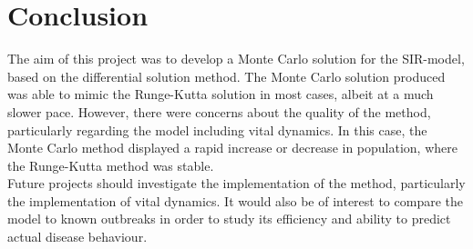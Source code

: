 \documentclass[notitlepage, reprint, nofootinbib]{revtex4-1}
\begin{document}
\section{Conclusion}
The aim of this project was to develop a Monte Carlo solution for the SIR-model, based on the differential solution method. The Monte Carlo solution produced was able to mimic the Runge-Kutta solution in most cases, albeit at a much slower pace. However, there were concerns about the quality of the method, particularly regarding the model including vital dynamics. In this case, the Monte Carlo method displayed a rapid increase or decrease in population, where the Runge-Kutta method was stable. \\[2mm]
Future projects should investigate the implementation of the method, particularly the implementation of vital dynamics. It would also be of interest to compare the model to known outbreaks in order to study its efficiency and ability to predict actual disease behaviour.



\onecolumngrid


\end{document}
